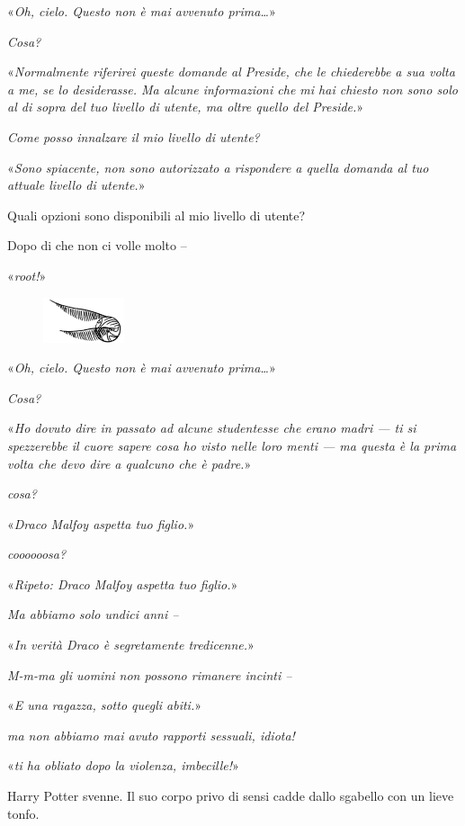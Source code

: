 «\textit{Oh, cielo. Questo non è mai avvenuto prima…}»

\textit{Cosa?}

«\textit{Normalmente riferirei queste domande al Preside, che le chiederebbe a sua volta a me, se lo desiderasse. Ma alcune informazioni che mi hai chiesto non sono solo al di sopra del tuo livello di utente, ma oltre quello del Preside.}»

\textit{Come posso innalzare il mio livello di utente?}

«\textit{Sono spiacente, non sono autorizzato a rispondere a quella domanda al tuo attuale livello di utente.}»

Quali opzioni sono disponibili al mio livello di utente?

Dopo di che non ci volle molto –

«\textit{root!}»

\begin{figure}[h]
	\includegraphics[scale=0.4]{boccino.png}
	\centering
\end{figure}

«\textit{Oh, cielo. Questo non è mai avvenuto prima…}»

\textit{Cosa?}

«\textit{Ho dovuto dire in passato ad alcune studentesse che erano madri — ti si spezzerebbe il cuore sapere cosa ho visto nelle loro menti — ma questa è la prima volta che devo dire a qualcuno che è padre.}»

\textit{cosa?}

«\textit{Draco Malfoy aspetta tuo figlio.}»

\textit{coooooosa?}

«\textit{Ripeto: Draco Malfoy aspetta tuo figlio.}»

\textit{Ma abbiamo solo undici anni –}

«\textit{In verità Draco è segretamente tredicenne.}»

\textit{M-m-ma gli uomini non possono rimanere incinti –}

«\textit{E una ragazza, sotto quegli abiti.}»

\textit{ma non abbiamo mai avuto rapporti sessuali, idiota!}

«\textit{ti ha obliato dopo la violenza, imbecille!}»

Harry Potter svenne. Il suo corpo privo di sensi cadde dallo sgabello con un lieve tonfo.

